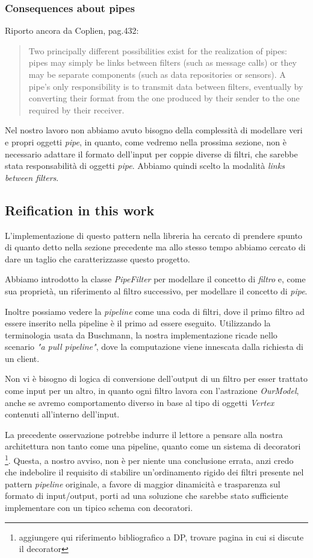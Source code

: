 \subsubsection{Consequences about pipes}
Riporto ancora da Coplien, pag.432:
\begin{quotation}
  Two principally different possibilities exist for the realization of
  pipes: pipes may simply be links between filters (such as message
  calls) or they may be separate components (such as data repositories
  or sensors). A pipe's only responsibility is to transmit data
  between filters, eventually by converting their format from the one
  produced by their sender to the one required by their receiver.
\end{quotation}
Nel nostro lavoro non abbiamo avuto bisogno della complessit\`a di
modellare veri e propri oggetti \emph{pipe}, in quanto, come vedremo
nella prossima sezione, non \`e necessario adattare il formato
dell'input per coppie diverse di filtri, che sarebbe stata
responsabilit\`a di oggetti \emph{pipe}. Abbiamo quindi scelto la
modalit\`a \emph{links between filters}.

\subsection{Reification in this work}
L'implementazione di questo pattern nella libreria ha cercato di
prendere spunto di quanto detto nella sezione precedente ma allo
stesso tempo abbiamo cercato di dare un taglio che caratterizzasse
questo progetto. 

Abbiamo introdotto la classe \emph{PipeFilter} per modellare il
concetto di \emph{filtro} e, come sua propriet\`a, un riferimento al
filtro successivo, per modellare il concetto di \emph{pipe}.

Inoltre possiamo vedere la \emph{pipeline} come una coda di filtri,
dove il primo filtro ad essere inserito nella pipeline \`e il primo ad
essere eseguito. Utilizzando la terminologia usata da Buschmann, la
nostra implementazione ricade nello scenario \emph{"a pull pipeline"},
dove la computazione viene innescata dalla richiesta di un client.

Non vi \`e bisogno di logica di conversione dell'output di un filtro
per esser trattato come input per un altro, in quanto ogni filtro
lavora con l'astrazione \emph{OurModel}, anche se avremo comportamento
diverso in base al tipo di oggetti \emph{Vertex} contenuti all'interno
dell'input.

La precedente osservazione potrebbe indurre il lettore a pensare alla
nostra architettura non tanto come una pipeline, quanto come un
sistema di decoratori \footnote{aggiungere qui riferimento
  bibliografico a DP, trovare pagina in cui si discute il
  decorator}. Questa, a nostro avviso, non \`e per niente una
conclusione errata, anzi credo che indebolire il requisito di
stabilire un'ordinamento rigido dei filtri presente nel pattern
\emph{pipeline} originale, a favore di maggior dinamicit\`a e
trasparenza sul formato di input/output, porti ad una soluzione che
sarebbe stato sufficiente implementare con un tipico schema con
decoratori.
